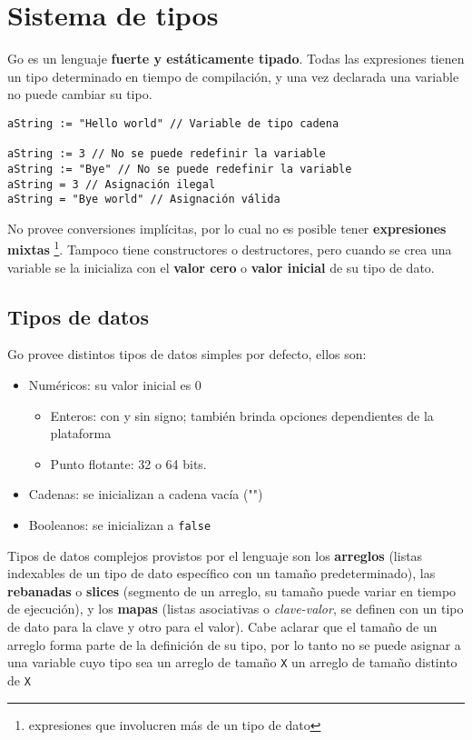 \section{Sistema de tipos}

Go es un lenguaje \textbf{fuerte y estáticamente tipado}. Todas las expresiones tienen un tipo determinado en tiempo de compilación, y una vez declarada una variable no puede cambiar su tipo.

\vspace*{5mm}
\begin{lstlisting}[title=\centering Ejemplos de asignaciones válidas e inválidas (nótese el uso de los operadores \dq{:=} y \dq{=})]
aString := "Hello world" // Variable de tipo cadena

aString := 3 // No se puede redefinir la variable
aString := "Bye" // No se puede redefinir la variable
aString = 3 // Asignación ilegal
aString = "Bye world" // Asignación válida

\end{lstlisting}

No provee conversiones implícitas, por lo cual no es posible tener \textbf{expresiones mixtas} \footnote{expresiones que involucren más de un tipo de dato}. Tampoco tiene constructores o destructores, pero cuando se crea una variable se la inicializa con el \textbf{valor cero} o \textbf{valor inicial} de su tipo de dato.

\subsection{Tipos de datos}

Go provee distintos tipos de datos simples por defecto, ellos son:

\begin{itemize}
    \item Numéricos: su valor inicial es 0
    \begin{itemize}
        \item Enteros: con y sin signo; también brinda opciones dependientes de la plataforma
        \item Punto flotante: 32 o 64 bits.
    \end{itemize}
    \item Cadenas: se inicializan a cadena vacía ("")
    \item Booleanos: se inicializan a \texttt{false} 
\end{itemize}

Tipos de datos complejos provistos por el lenguaje son los \textbf{arreglos} (listas indexables de un tipo de dato específico con un tamaño predeterminado), las \textbf{rebanadas} o \textbf{slices} (segmento de un arreglo, su tamaño puede variar en tiempo de ejecución), y los \textbf{mapas} (listas asociativas o \emph{clave-valor}, se definen con un tipo de dato para la clave y otro para el valor). Cabe aclarar que el tamaño de un arreglo forma parte de la definición de su tipo, por lo tanto no se puede asignar a una variable cuyo tipo sea un arreglo de tamaño \texttt{X} un arreglo de tamaño distinto de \texttt{X} 


